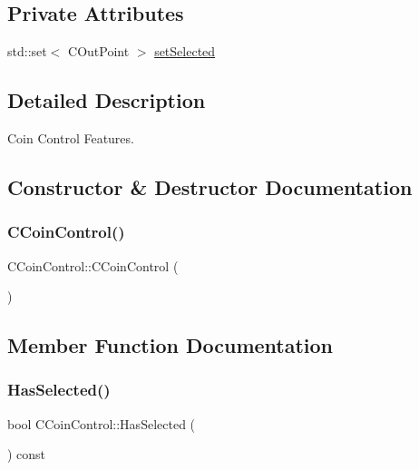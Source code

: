 \subsection*{Private Attributes}
\begin{DoxyCompactItemize}
\item 
std\+::set$<$ C\+Out\+Point $>$ \mbox{\hyperlink{class_c_coin_control_ad8f80901aa608a4073cb9138f07d3e4e}{set\+Selected}}
\end{DoxyCompactItemize}


\subsection{Detailed Description}
Coin Control Features. 

\subsection{Constructor \& Destructor Documentation}
\mbox{\label{class_c_coin_control_a76b6d0cfff21c4d74a4c4aebfc7f697d}} 
\subsubsection{\texorpdfstring{C\+Coin\+Control()}{CCoinControl()}}
{\footnotesize\ttfamily C\+Coin\+Control\+::\+C\+Coin\+Control (\begin{DoxyParamCaption}{ }\end{DoxyParamCaption})\hspace{0.3cm}{\ttfamily [inline]}}



\subsection{Member Function Documentation}
\mbox{\label{class_c_coin_control_a20b259681a7c62b2119256a4862091ac}} 
\subsubsection{\texorpdfstring{Has\+Selected()}{HasSelected()}}
{\footnotesize\ttfamily bool C\+Coin\+Control\+::\+Has\+Selected (\begin{DoxyParamCaption}{ }\end{DoxyParamCaption}) const\hspace{0.3cm}{\ttfamily [inline]}}

